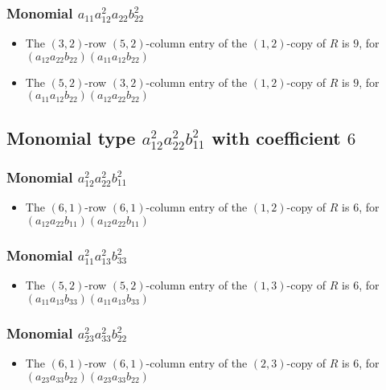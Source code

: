 \documentclass{article}
\begin{document}
\subsubsection{Monomial $ a_{11} a_{12}^{2} a_{22} b_{22}^{2} $}

\begin{itemize}
\item The $(3, 2)$-row $(5, 2)$-column entry of the $ \left(1, 2\right) $-copy of $R$ is $ 9 $, for $( a_{12} a_{22} b_{22} )( a_{11} a_{12} b_{22} )$ 
\item The $(5, 2)$-row $(3, 2)$-column entry of the $ \left(1, 2\right) $-copy of $R$ is $ 9 $, for $( a_{11} a_{12} b_{22} )( a_{12} a_{22} b_{22} )$ 
\end{itemize}
\subsection{Monomial type $ a_{12}^{2} a_{22}^{2} b_{11}^{2} $ with coefficient $ 6 $}

\subsubsection{Monomial $ a_{12}^{2} a_{22}^{2} b_{11}^{2} $}

\begin{itemize}
\item The $(6, 1)$-row $(6, 1)$-column entry of the $ \left(1, 2\right) $-copy of $R$ is $ 6 $, for $( a_{12} a_{22} b_{11} )( a_{12} a_{22} b_{11} )$ 
\end{itemize}
\subsubsection{Monomial $ a_{11}^{2} a_{13}^{2} b_{33}^{2} $}

\begin{itemize}
\item The $(5, 2)$-row $(5, 2)$-column entry of the $ \left(1, 3\right) $-copy of $R$ is $ 6 $, for $( a_{11} a_{13} b_{33} )( a_{11} a_{13} b_{33} )$ 
\end{itemize}
\subsubsection{Monomial $ a_{23}^{2} a_{33}^{2} b_{22}^{2} $}

\begin{itemize}
\item The $(6, 1)$-row $(6, 1)$-column entry of the $ \left(2, 3\right) $-copy of $R$ is $ 6 $, for $( a_{23} a_{33} b_{22} )( a_{23} a_{33} b_{22} )$ 
\end{itemize}
\end{document}
